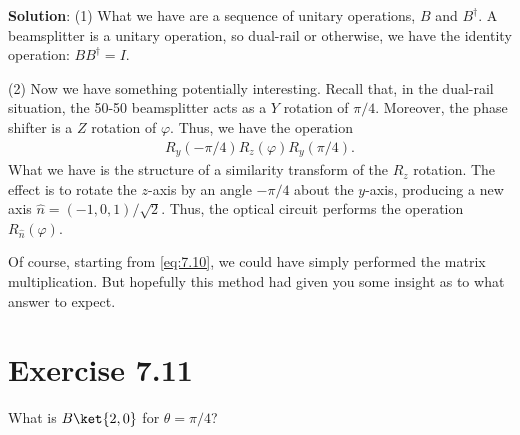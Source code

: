 \documentclass{book}
\begin{document}
    \textbf{Solution}: (1) What we have are a sequence of unitary operations, $B$ and $B^\dagger$. A beamsplitter is a unitary operation, so dual-rail or otherwise, we have the identity operation: $BB^\dagger = I$.

    (2) Now we have something potentially interesting. Recall that, in the dual-rail situation, the 50-50 beamsplitter acts as a $Y$ rotation of $\pi/4$. Moreover, the phase shifter is a $Z$ rotation of $\varphi$. Thus, we have the operation
    \begin{align} \label{eq:7.10}
        R_y(-\pi/4) R_z(\varphi) R_y(\pi/4).
    \end{align}
    What we have is the structure of a similarity transform of the $R_z$ rotation. The effect is to rotate the $z$-axis by an angle $-\pi/4$ about the $y$-axis, producing a new axis $\hat{n} = (-1,0,1)/\sqrt{2}$. Thus, the optical circuit performs the operation $R_{\hat{n}}(\varphi)$.

    Of course, starting from \eqref{eq:7.10}, we could have simply performed the matrix multiplication. But hopefully this method had given you some insight as to what answer to expect. 

\section*{Exercise 7.11}
    What is $B\ket{2,0}$ for $\theta = \pi/4$?
\end{document}
